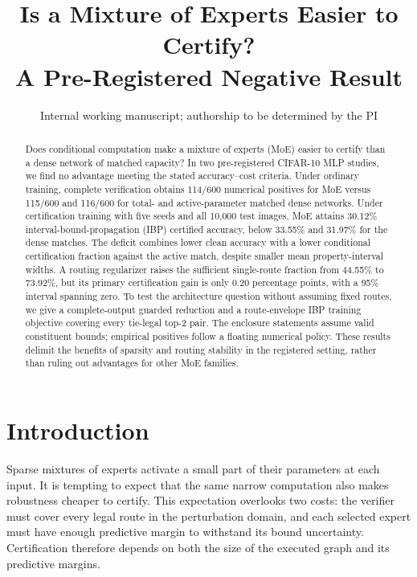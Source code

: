 \documentclass[10pt]{article}
\title{Is a Mixture of Experts Easier to Certify?\\ A Pre-Registered Negative Result}
\author{\name Internal working manuscript; authorship to be determined by the PI}
\begin{document}
\maketitle
{}
\begin{abstract}
Does conditional computation make a mixture of experts (MoE) easier to certify
than a dense network of matched capacity? In two pre-registered CIFAR-10 MLP
studies, we find no advantage meeting the stated accuracy--cost criteria.
Under ordinary training, complete verification obtains 114/600 numerical
positives for MoE versus 115/600 and 116/600 for total- and active-parameter
matched dense networks. Under certification training with five seeds and all
10,000 test images, MoE attains 30.12\% interval-bound-propagation (IBP)
certified accuracy, below 33.55\% and 31.97\% for the dense matches.
The deficit combines lower clean accuracy with a lower conditional
certification fraction against the active match, despite smaller mean
property-interval widths. A routing regularizer raises the sufficient
single-route fraction from 44.55\% to 73.92\%, but its primary certification
gain is only 0.20 percentage points, with a 95\% interval spanning zero.
To test the architecture question without assuming fixed routes, we give a
complete-output guarded reduction and a route-envelope IBP training objective
covering every tie-legal top-2 pair. The enclosure statements assume valid
constituent bounds; empirical positives follow a floating numerical policy.
These results delimit the benefits of sparsity and routing stability in the
registered setting, rather than ruling out advantages for other MoE families.
\end{abstract}

\section{Introduction}
Sparse mixtures of experts activate a small part of their parameters at each
input. It is tempting to expect that the same narrow computation also makes
robustness cheaper to certify. This expectation overlooks two costs: the
verifier must cover every legal route in the perturbation domain, and each
selected expert must have enough predictive margin to withstand its bound
uncertainty. Certification therefore depends on both the size of the executed
graph and its predictive margins.
\end{document}
